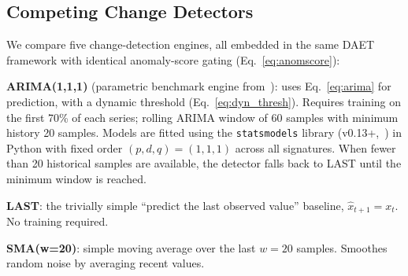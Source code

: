 \documentclass[pdflatex,sn-nature]{sn-jnl}
\theoremstyle{thmstyleone}%
\begin{document}
\begin{table}[tbp]
\centering
{}
\caption{Mozilla Treeherder dataset configurations.
  \emph{Canonical pipeline} (Section~\ref{sec:three_way}): 60\%/20\%/20\%
  chronological split, 30-point length filter, independent held-out
  validation for HP tuning.
  \emph{Calibration baseline} (Section~\ref{sec:largescale:RQ1}):
  70\%/30\% split on Firefox-Android only, 50-point filter, no independent
  validation hold-out --- retained for prior-work comparison.}
\label{tab:dataset}
\end{table}

\subsection{Competing Change Detectors}\label{sec:largescale:detectors}

We compare five change-detection engines, all embedded in the same DAET
framework with identical anomaly-score gating (Eq.~\ref{eq:anomscore}):

\textbf{ARIMA(1,1,1)} (parametric benchmark engine from~\cite{10197790}): uses Eq.~\ref{eq:arima} for
prediction, with a dynamic threshold (Eq.~\ref{eq:dyn_thresh}).
Requires training on the first 70\% of each series; rolling ARIMA window
of 60 samples with minimum history 20 samples.
Models are fitted using the \texttt{statsmodels} library
(v0.13+,~\cite{seabold2010statsmodels}) in Python with fixed order
$(p,d,q)=(1,1,1)$ across all signatures.
When fewer than 20 historical samples are available, the detector falls
back to LAST until the minimum window is reached.

\textbf{LAST}: the trivially simple ``predict the last observed value''
baseline, $\hat{x}_{t+1} = x_t$.
No training required.

\textbf{SMA(w=20)}: simple moving average over the last $w=20$ samples.
Smoothes random noise by averaging recent values.
\end{document}
